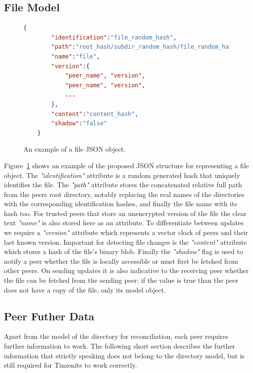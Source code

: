 \subsection{File Model}
\label{sec:file_model}

\begin{figure}[htp]
    \begin{lstlisting}[language=json,firstnumber=0]
    {
        "identification":"file_random_hash",
        "path":"root_hash/subdir_random_hash/file_random_hash",
        "name":"file",
        "version":{
            "peer_name", "version",
            "peer_name", "version",
            ...
        },
        "content":"content_hash",
        "shadow":"false"
    }
    \end{lstlisting}
\caption[File JSON Model]{An example of a file JSON object.}
\label{json:file_model}
\end{figure}

Figure~\ref{json:file_model} shows an example of the proposed JSON structure for representing a file object.
The \textit{"identification"} attribute is a random generated hash that uniquely identifies the file.
The \textit{"path"} attribute stores the concatenated relative full path from the peers root directory, notably replacing the real names of the directories with the corresponding identification hashes, and finally the file name with its hash too.
For trusted peers that store an unencrypted version of the file the clear text \textit{"name"} is also stored here as an attribute.
To differentiate between updates we require a \textit{"version"} attribute which represents a vector clock of peers and their last known version.
Important for detecting file changes is the \textit{"content"} attribute which stores a hash of the file's binary blob.
Finally the \textit{"shadow"} flag is used to notify a peer whether the file is locally accessible or must first be fetched from other peers.
On sending updates it is also indicative to the receiving peer whether the file can be fetched from the sending peer: if the value is true than the peer does not have a copy of the file, only its model object.

\subsection{Peer Futher Data}

Apart from the model of the directory for reconciliation, each peer requires further information to work.
The following short section describes the further information that strictly speaking does not belong to the directory model, but is still required for Tinzenite to work correctly.

